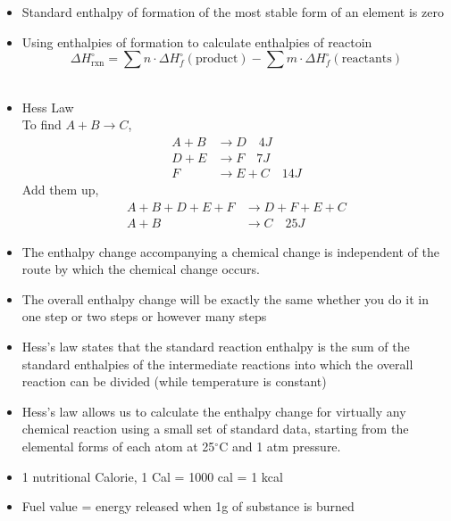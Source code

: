 \documentclass[11pt]{article}
\begin{document}
\begin{itemize}
    \item Standard enthalpy of formation of the most stable form of an element is zero
    \item Using enthalpies of formation to calculate enthalpies of reactoin
    \begin{equation}
        \Delta H^\circ_{\text{rxn}} = \sum{n\cdot \Delta H_f^\circ} (\text{product}) - \sum{m\cdot \Delta H_f^\circ} (\text{reactants})
    \end{equation}
    \\

    \item Hess Law \\
    To find $A + B \xrightarrow{} C$,
    \begin{align*}
        A + B &\xrightarrow{} D \quad 4J\\
        D + E &\xrightarrow{} F \quad 7J\\
        F &\xrightarrow{} E + C \quad 14J
    \end{align*}
    Add them up,
    \begin{align*}
        A + B + D + E + F &\xrightarrow{} D + F + E + C \\
        A + B &\xrightarrow{} C \quad 25J
    \end{align*}
    \item The enthalpy change accompanying a chemical change is independent of the route by which the chemical change occurs.
    \item The overall enthalpy change will be exactly the same whether you do it in one step or two steps or however many steps
    \item Hess's law states that the standard reaction enthalpy is the sum of the standard enthalpies of the intermediate reactions into which the overall reaction can be divided (while temperature is constant)
    \item Hess's law allows us to calculate the enthalpy change for virtually any chemical reaction using a small set of standard data, starting from the elemental forms of each atom at 25$^\circ$C and 1 atm pressure.
    \\

    \item 1 nutritional Calorie, 1 Cal = 1000 cal = 1 kcal
    \item Fuel value = energy released when 1g of substance is burned
\end{itemize}
\end{document}
